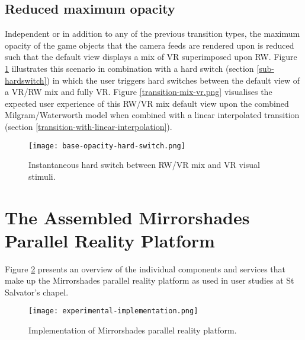 \subsection{Reduced maximum opacity}
\label{subsub-baseopacity}
Independent or in addition to any of the previous transition types, the maximum opacity of the game objects that the camera feeds are rendered upon is reduced such that the default view displays a mix of VR superimposed upon RW. Figure \ref{scenariobaseopacity} illustrates this scenario in combination with a hard switch (section \ref{sub-hardswitch}) in which the user triggers hard switches between the default view of a VR/RW mix and fully VR. Figure \ref{transition-mix-vr.png} visualises the expected user experience of this RW/VR mix default view upon the combined Milgram/Waterworth model when combined with a linear interpolated transition (section \ref{transition-with-linear-interpolation}).

\begin{figure}[h]
	\begin{center}
		\texttt{[image: base-opacity-hard-switch.png]}
		\caption{Instantaneous hard switch between RW/VR mix and VR visual stimuli.}
		\label{scenariobaseopacity}
	\end{center}
\end{figure}


\section{The Assembled Mirrorshades Parallel Reality Platform}

Figure \ref{experimentalimplementation} presents an overview of the individual components and services that make up the Mirrorshades parallel reality platform as used in user studies at St Salvator's chapel.

\begin{figure}[h]
	\thispagestyle{empty}
	\begin{center}
		\texttt{[image: experimental-implementation.png]}
		\caption{Implementation of Mirrorshades parallel reality platform.}
		\label{experimentalimplementation}
	\end{center}
\end{figure}


